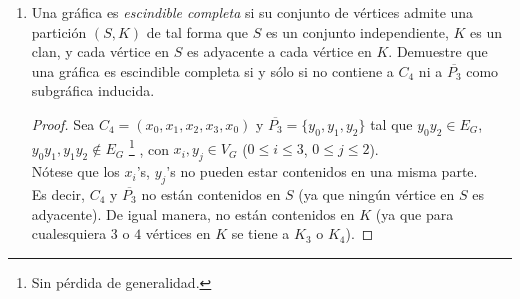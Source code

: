 \documentclass{article}
\begin{document}
\begin{enumerate}
\begin{proof}
\begin{itemize}
          Además, sabemos que el número de componentes conexas aumenta exactamente en
          $1$ en $G -e$ (porque estamos trabajando con gráficas simples). \\
          De esto, se sigue que:
          \begin{eqnarray}
            c(G -e) = c(G) +1\\
            \Rightarrow c(G -e) \leq c(G) +1
          \end{eqnarray}
          De $7$ y $9$ se sigue que:
          \[
          c(G) \le c(G-e) \le c(G) + 1
          \]
        \end{itemize}
        De lo anterior, concluimos que $c(G) \le c(G-e) \le c(G) + 1$. \\
      \end{proof}

  \item Una gr\'afica es \textit{escindible completa} si su conjunto de
    v\'ertices admite una partici\'on $(S,K)$ de tal forma que $S$ es un
    conjunto independiente, $K$ es un clan, y cada v\'ertice en $S$ es adyacente
    a cada v\'ertice en $K$. Demuestre que una gr\'afica es escindible
    completa si y s\'olo si no contiene a $C_4$ ni a $\overline{P_3}$ como
    subgr\'afica inducida. \\

    \renewcommand\qedsymbol{QED}
    \begin{proof}
      Sea $C_4 = (x_0, x_1, x_2, x_3, x_0)$ y $\overline{P_3} = \{y_0, y_1, y_2\}$
      tal que $y_0 y_2 \in E_G$, $y_0 y_1, y_1 y_2 \notin E_G$
      \footnote{Sin pérdida de generalidad.}
      , con $x_i, y_j \in V_G$ ($0 \leq i \leq 3$, $0 \leq j \leq 2$). \\
      N\'otese que los $x_i$'s, $y_j$'s no pueden estar contenidos en una misma parte. \\
      Es decir, $C_4$ y $\overline{P_3}$ no est\'an contenidos en $S$ (ya que ning\'un
      v\'ertice en $S$ es adyacente). De igual manera, no est\'an contenidos en $K$
      (ya que para cualesquiera $3$ o $4$ v\'ertices en $K$ se tiene a $K_3$ o $K_4$).


\end{proof}
\end{enumerate}
\end{document}
